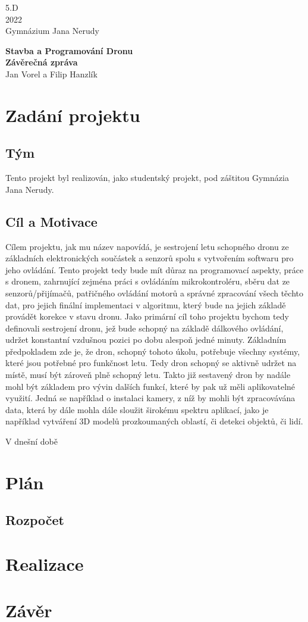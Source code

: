 \documentclass[12pt]{report}
\begin{document}
\begin{titlepage}
	\begin{flushright}
	5.D \\
	2022 \\
	Gymnázium Jana Nerudy
	\end{flushright}
	\vspace*{6cm}
	
	\begin{center}
		\textbf{\huge Stavba a Programování Dronu} \\
		\textbf{\huge Závěrečná zpráva } \\[\baselineskip]
		{\LARGE Jan Vorel a Filip Hanzlík}
	\end{center}		
\end{titlepage}


\tableofcontents

\chapter{Zadání projektu}
\section{Tým}
Tento projekt byl realizován, jako studentský projekt, pod záštitou Gymnázia Jana Nerudy.

\section{Cíl a Motivace}
Cílem projektu, jak mu název napovídá, je sestrojení letu schopného dronu ze základních elektronických součástek a senzorů spolu s vytvořením softwaru pro jeho ovládání. Tento projekt tedy bude mít důraz na programovací aspekty, práce s dronem, zahrnující zejména práci s ovládáním mikrokontroléru, sběru dat ze senzorů/přijímačů, patřičného ovládání motorů a správné zpracování všech těchto dat, pro jejich finální implementaci v algoritmu, který bude na jejich základě provádět korekce v stavu dronu. Jako primární cíl toho projektu bychom tedy definovali sestrojení dronu, jež bude schopný na základě dálkového ovládání, udržet konstantní vzdušnou pozici po dobu alespoň jedné minuty. Základním předpokladem zde je, že dron, schopný tohoto úkolu, potřebuje všechny systémy, které jsou potřebné pro funkčnost letu. Tedy dron schopný se aktivně udržet na místě, musí být zároveň plně schopný letu. Takto již sestavený dron by nadále mohl být základem pro vývin dalších funkcí, které by pak už měli aplikovatelné využití. Jedná se například o instalaci kamery, z níž by mohli být zpracovávána data, která by dále mohla dále sloužit širokému spektru aplikací, jako je například vytváření 3D modelů prozkoumaných oblastí, či detekci objektů, či lidí.

V dnešní době     

\chapter{Plán}
\section{Rozpočet}

\chapter{Realizace}

\chapter{Závěr}
\end{document}
